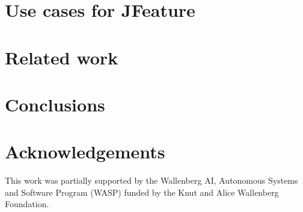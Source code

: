 \section{Use cases for JFeature}
\label{sec:discussion}


\section{Related work}
\label{sec:related-works}


\section{Conclusions}
\label{sec:conclusions}



\section*{Acknowledgements}

This work was partially supported by the Wallenberg AI, Autonomous Systems and Software Program (WASP) funded by the Knut and Alice Wallenberg Foundation.

{\raggedright
\printbibliography[segment=\therefsegment,heading=subbibliography]
}